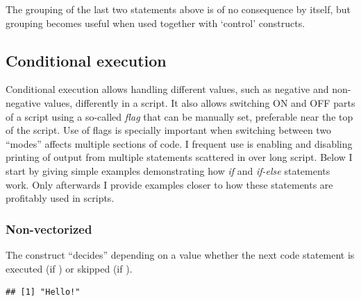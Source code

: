 \documentclass[krantz2]{krantz}\usepackage{knitr}%
\begin{document}
The grouping of the last two statements above is of no consequence by itself, but grouping becomes useful when used together with `control' constructs.

\subsection{Conditional execution}

Conditional execution allows handling different values, such as negative and non-negative values, differently in a script. It also allows switching ON and OFF parts of a script using a so-called \emph{flag} that can be manually set, preferable near the top of the script. Use of flags is specially important when switching between two ``modes'' affects multiple sections of code. I frequent use is enabling and disabling printing of output from multiple statements scattered in over long script. Below I start by giving simple examples demonstrating how \emph{if} and \emph{if-else} statements work. Only afterwards I provide examples closer to how these statements are profitably used in \Rlang scripts.

\subsubsection{Non-vectorized}
%

The  construct ``decides'' depending on a  value whether the next code statement is executed (if ) or skipped (if ).

\begin{knitrout}\footnotesize
{}\color{fgcolor}\begin{kframe}
\begin{alltt}
 \hlkwb{<-} 
  \hlstd{(}\hlstd{)}
\end{alltt}
\begin{verbatim}
## [1] "Hello!"
\end{verbatim}
\end{kframe}
\end{knitrout}
\end{document}
